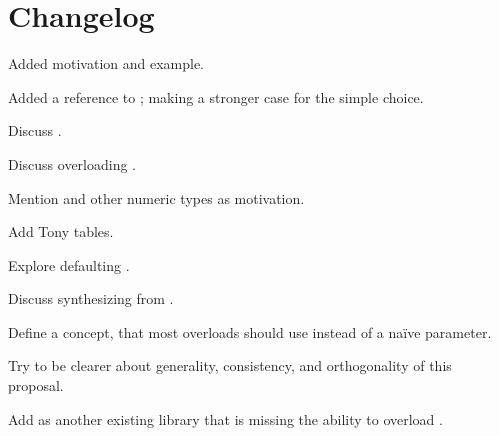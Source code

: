 \section{Changelog}
\begin{revision}
  \item Added  motivation and example.
  \item Added a reference to \cite{P0927R0}; making a stronger case for the simple choice.
\end{revision}

\begin{revision}
  \item Discuss .
  \item Discuss overloading .
  \item Mention  and other numeric types as motivation.
\end{revision}

\begin{revision}
  \item Add Tony tables.
  \item Explore defaulting .
  \item Discuss synthesizing  from .
  \item Define a  concept, that most overloads should use instead of a naïve \bool parameter.
  \item Try to be clearer about generality, consistency, and orthogonality of this proposal.
  \item Add  as another existing library that is missing the ability to overload .
\end{revision}

